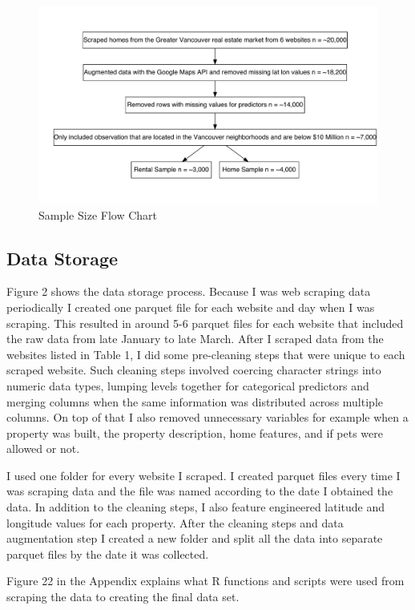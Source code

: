 \documentclass[
]{article}
\begin{document}
\begin{figure}
\centering
\includegraphics{final_report_files/figure-latex/sample-size-1.pdf}
\caption{Sample Size Flow Chart}
\end{figure}

\hypertarget{data-storage}{%
\subsection{Data Storage}\label{data-storage}}

Figure 2 shows the data storage process. Because I was web scraping data
periodically I created one parquet file for each website and day when I
was scraping. This resulted in around 5-6 parquet files for each website
that included the raw data from late January to late March. After I
scraped data from the websites listed in Table 1, I did some
pre-cleaning steps that were unique to each scraped website. Such
cleaning steps involved coercing character strings into numeric data
types, lumping levels together for categorical predictors and merging
columns when the same information was distributed across multiple
columns. On top of that I also removed unnecessary variables for example
when a property was built, the property description, home features, and
if pets were allowed or not.

I used one folder for every website I scraped. I created parquet files
every time I was scraping data and the file was named according to the
date I obtained the data. In addition to the cleaning steps, I also
feature engineered latitude and longitude values for each property.
After the cleaning steps and data augmentation step I created a new
folder and split all the data into separate parquet files by the date it
was collected.

Figure 22 in the Appendix explains what R functions and scripts were
used from scraping the data to creating the final data set.
\end{document}
